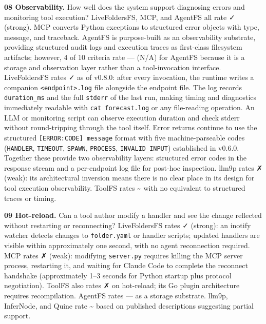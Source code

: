 \documentclass[
  11pt,
]{article}
\begin{document}
\textbf{08 Observability.} How well does the system support diagnosing
errors and monitoring tool execution? LiveFoldersFS, MCP, and AgentFS
all rate ✓ (strong). MCP converts Python exceptions to structured error
objects with type, message, and traceback. AgentFS is purpose-built as
an observability substrate, providing structured audit logs and
execution traces as first-class filesystem artifacts; however, 4 of 10
criteria rate --- (N/A) for AgentFS because it is a storage and
observation layer rather than a tool-invocation interface. LiveFoldersFS
rates ✓ as of v0.8.0: after every invocation, the runtime writes a
companion \texttt{\textless{}endpoint\textgreater{}.log} file alongside
the endpoint file. The log records \texttt{duration\_ms} and the full
\texttt{stderr} of the last run, making timing and diagnostics
immediately readable with \texttt{cat\ forecast.log} or any file-reading
operation. An LLM or monitoring script can observe execution duration
and check stderr without round-tripping through the tool itself. Error
returns continue to use the structured
\texttt{{[}ERROR:CODE{]}\ message} format with five machine-parseable
codes (\texttt{HANDLER}, \texttt{TIMEOUT}, \texttt{SPAWN},
\texttt{PROCESS}, \texttt{INVALID\_INPUT}) established in v0.6.0.
Together these provide two observability layers: structured error codes
in the response stream and a per-endpoint log file for post-hoc
inspection. llm9p rates ✗ (weak): its architectural inversion means
there is no clear place in its design for tool execution observability.
ToolFS rates \textasciitilde{} with no equivalent to structured traces
or timing.

\textbf{09 Hot-reload.} Can a tool author modify a handler and see the
change reflected without restarting or reconnecting? LiveFoldersFS rates
✓ (strong): an inotify watcher detects changes to \texttt{folder.yaml}
or handler scripts; updated handlers are visible within approximately
one second, with no agent reconnection required. MCP rates ✗ (weak):
modifying \texttt{server.py} requires killing the MCP server process,
restarting it, and waiting for Claude Code to complete the reconnect
handshake (approximately 1--3 seconds for Python startup plus protocol
negotiation). ToolFS also rates ✗ on hot-reload; its Go plugin
architecture requires recompilation. AgentFS rates --- as a storage
substrate. llm9p, InferNode, and Quine rate \textasciitilde{} based on
published descriptions suggesting partial support.
\end{document}
